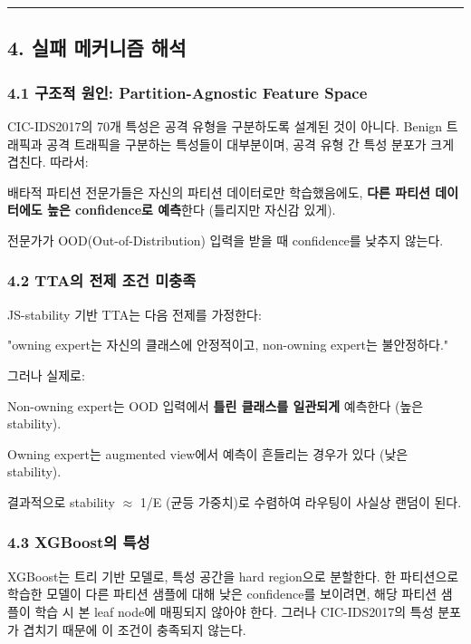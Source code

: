 \medskip\hrule\medskip
\subsection{4. 실패 메커니즘 해석}
\subsubsection{4.1 구조적 원인: Partition-Agnostic Feature Space}
CIC-IDS2017의 70개 특성은 공격 유형을 구분하도록 설계된 것이 아니다. Benign 트래픽과 공격 트래픽을 구분하는 특성들이 대부분이며, 공격 유형 간 특성 분포가 크게 겹친다. 따라서:

\par\noindent \textbullet\enspace 배타적 파티션 전문가들은 자신의 파티션 데이터로만 학습했음에도, \textbf{다른 파티션 데이터에도 높은 confidence로 예측}한다 (틀리지만 자신감 있게).


\par\noindent \textbullet\enspace 전문가가 OOD(Out-of-Distribution) 입력을 받을 때 confidence를 낮추지 않는다.


\subsubsection{4.2 TTA의 전제 조건 미충족}
JS-stability 기반 TTA는 다음 전제를 가정한다:

"owning expert는 자신의 클래스에 안정적이고, non-owning expert는 불안정하다."



그러나 실제로:

\par\noindent \textbullet\enspace Non-owning expert는 OOD 입력에서 \textbf{틀린 클래스를 일관되게} 예측한다 (높은 stability).


\par\noindent \textbullet\enspace Owning expert는 augmented view에서 예측이 흔들리는 경우가 있다 (낮은 stability).


\par\noindent \textbullet\enspace 결과적으로 stability \ensuremath{\approx} 1/\allowbreak{}E (균등 가중치)로 수렴하여 라우팅이 사실상 랜덤이 된다.


\subsubsection{4.3 XGBoost의 특성}
XGBoost는 트리 기반 모델로, 특성 공간을 hard region으로 분할한다. 한 파티션으로 학습한 모델이 다른 파티션 샘플에 대해 낮은 confidence를 보이려면, 해당 파티션 샘플이 학습 시 본 leaf node에 매핑되지 않아야 한다. 그러나 CIC-IDS2017의 특성 분포가 겹치기 때문에 이 조건이 충족되지 않는다.


